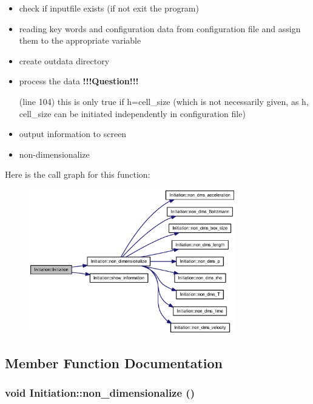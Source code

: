 \begin{itemize}
\item check if inputfile exists (if not exit the program)

\item reading key words and configuration data from configuration file and assign them to the appropriate variable

\item create outdata directory

\item process the data {\bf !!!Question!!!}

(line 104) this is only true if h=cell\_\-size (which is not necessarily given, as h, cell\_\-size can be initiated independently in configuration file)

\item output information to screen

\item non-dimensionalize \par
\par
 \end{itemize}


Here is the call graph for this function:\nopagebreak
\begin{figure}[H]
\begin{center}
\leavevmode
\includegraphics[width=255pt]{classInitiation_4db3b8c45d38cf4e188de6aa672e8c0d_cgraph}
\end{center}
\end{figure}


\subsection{Member Function Documentation}
\hypertarget{classInitiation_916e5b3e316dad1f524a1327b9e4aeb4}{
\subsubsection[{non\_\-dimensionalize}]{\setlength{\rightskip}{0pt plus 5cm}void Initiation::non\_\-dimensionalize ()}}
\label{classInitiation_916e5b3e316dad1f524a1327b9e4aeb4}


